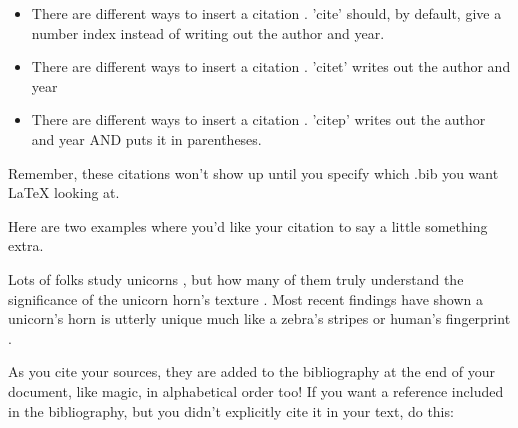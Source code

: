 \documentclass[12pt]{article} %
\begin{document}
\begin{itemize}
\item There are different ways to insert a citation \cite{Roberts2011}.  'cite' should, by default, give a number index instead of writing out the author and year.\\
\item There are different ways to insert a citation \citet{Roberts2011}. 'citet' writes out the author and year\\
\item There are different ways to insert a citation \citep{Roberts2011}. 'citep' writes out the author and year AND puts it in parentheses.\\
\end{itemize}

Remember, these citations won't show up until you specify which .bib you want LaTeX looking at.

Here are two examples where you'd like your citation to say a little something extra.

Lots of folks study unicorns \citep[etc]{Rowland2000}, but how many of them truly understand the significance of the unicorn horn's texture \citep[Figure 2]{Scott1986}.  Most recent findings have shown a unicorn's horn is utterly unique much like a zebra's stripes or human's fingerprint \citep{Roberts2011, Rowland2000, Scott1986}. %

As you cite your sources, they are added to the bibliography at the end of your document, like magic, in alphabetical order too!  If you want a reference included in the bibliography, but you didn't explicitly cite it in your text, do this:

\nocite{Sakimoto2003}



\end{document}
